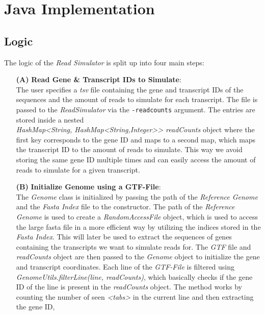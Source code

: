 \documentclass[12pt]{article}
\begin{document}

\section{Java Implementation}
\subsection{Logic}
The logic of the \textit{Read Simulator} is split up into four main steps:
\begin{enumerate}
	\item[\textbf{(A)}] \textbf{Read Gene \& Transcript IDs to Simulate}:\\
		The user specifies a \textit{tsv} file containing the gene and transcript IDs of the sequences and the
		amount of reads to simulate for each transcript. The file is passed to the \textit{ReadSimulator}
		via the \texttt{-readcounts} argument. The entries are stored inside a nested \\
		\textit{HashMap<String, HashMap<String,Integer>\hspace{0.1mm}> readCounts} object where
		the first key corresponds to the gene ID and maps to a second map, which maps the transcript ID to the amount of reads to simulate.
		This way we avoid storing the same gene ID multiple times and can easily access the amount of reads to simulate for a given transcript.
	\item[\textbf{(B)}] \textbf{Initialize Genome using a GTF-File}:\\
		The \textit{Genome} class is initialized by passing the path of the \textit{Reference Genome} and the \textit{Fasta Index} file to the constructor.
		The path of the \textit{Reference Genome} is used to create a \textit{RandomAccessFile} object, which is used to
		access the large fasta file in a more efficient way by utilizing the indices stored in the \textit{Fasta Index}.
		This will later be used to extract the sequences of genes containing the transcripts we want to simulate reads for.
		The \textit{GTF} file and \textit{readCounts} object are then passed to the \textit{Genome} object to initialize the gene and transcript coordinates.
		Each line of the \textit{GTF-File} is filtered using \textit{GenomeUtils.filterLine(line, readCounts)}, which
		basically checks if the gene ID of the line is present in the \textit{readCounts} object.
		The method works by counting the number of seen \textit{<tabs>} in the current line and then extracting the gene ID,

\end{enumerate}
\end{document}

